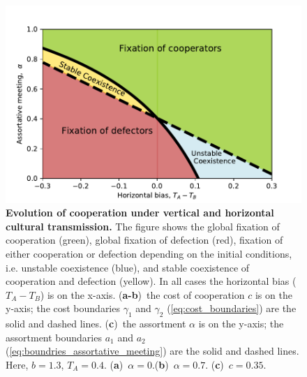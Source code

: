 \documentclass[12pt]{extarticle}
\begin{document}
{\begin{figure}[htb]
    \includegraphics[scale=0.75]{boundiries_withAlpha_y_axis.pdf}
    \caption{\textbf{Evolution of cooperation under vertical and horizontal cultural transmission.} 
The figure shows the global fixation of cooperation (green), global fixation of defection (red), fixation of either cooperation or defection depending on the initial conditions, i.e. unstable coexistence (blue), and stable coexistence of cooperation and defection (yellow).
In all cases the horizontal bias ($T_A-T_B$) is on the x-axis.
(\textbf{a-b})~the cost of cooperation $c$ is on the y-axis; the cost boundaries $\gamma_1$ and $\gamma_2$ (\autoref{eq:cost_boundaries}) are the solid and dashed lines. 
(\textbf{c})~the assortment $\alpha$ is on the y-axis; the assortment boundaries $a_1$ and $a_2$ (\autoref{eq:boundries_assortative_meeting}) are the solid and dashed lines.
Here, $b=1.3$, $T_A=0.4$. (\textbf{a})~$\alpha = 0$.(\textbf{b})~$\alpha = 0.7$. (\textbf{c})~$c = 0.35$.
  	}
    \label{fig:results2}
\end{figure}

}
\end{document}
